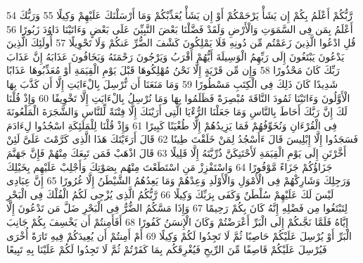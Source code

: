 \documentclass[20pt,a4paper]{article}
\begin{document}
{\tiny\colorbox{cl_aya}{54}} رَّبُّكُمْ أَعْلَمُ بِكُمْ إِن يَشَأْ يَرْحَمْكُمْ أَوْ إِن يَشَأْ يُعَذِّبْكُمْ وَمَا أَرْسَلْنَكَ عَلَيْهِمْ وَكِيلًا
{\tiny\colorbox{cl_aya}{55}} وَرَبُّكَ أَعْلَمُ بِمَن فِى السَّمَوَتِ وَالْأَرْضِ وَلَقَدْ فَضَّلْنَا بَعْضَ النَّبِيِّنَ عَلَى بَعْضٍ وَءَاتَيْنَا دَاوُدَ زَبُورًا
{\tiny\colorbox{cl_aya}{56}} قُلِ ادْعُوا الَّذِينَ زَعَمْتُم مِّن دُونِهِ فَلَا يَمْلِكُونَ كَشْفَ الضُّرِّ عَنكُمْ وَلَا تَحْوِيلًا
{\tiny\colorbox{cl_aya}{57}} أُولَئِكَ الَّذِينَ يَدْعُونَ يَبْتَغُونَ إِلَى رَبِّهِمُ الْوَسِيلَةَ أَيُّهُمْ أَقْرَبُ وَيَرْجُونَ رَحْمَتَهُ وَيَخَافُونَ عَذَابَهُ إِنَّ عَذَابَ رَبِّكَ كَانَ مَحْذُورًا
{\tiny\colorbox{cl_aya}{58}} وَإِن مِّن قَرْيَةٍ إِلَّا نَحْنُ مُهْلِكُوهَا قَبْلَ يَوْمِ الْقِيَمَةِ أَوْ مُعَذِّبُوهَا عَذَابًا شَدِيدًا كَانَ ذَلِكَ فِى الْكِتَبِ مَسْطُورًا
{\tiny\colorbox{cl_aya}{59}} وَمَا مَنَعَنَا أَن نُّرْسِلَ بِالْءَايَتِ إِلَّا أَن كَذَّبَ بِهَا الْأَوَّلُونَ وَءَاتَيْنَا ثَمُودَ النَّاقَةَ مُبْصِرَةً فَظَلَمُوا بِهَا وَمَا نُرْسِلُ بِالْءَايَتِ إِلَّا تَخْوِيفًا
{\tiny\colorbox{cl_aya}{60}} وَإِذْ قُلْنَا لَكَ إِنَّ رَبَّكَ أَحَاطَ بِالنَّاسِ وَمَا جَعَلْنَا الرُّءْيَا الَّتِى أَرَيْنَكَ إِلَّا فِتْنَةً لِّلنَّاسِ وَالشَّجَرَةَ الْمَلْعُونَةَ فِى الْقُرْءَانِ وَنُخَوِّفُهُمْ فَمَا يَزِيدُهُمْ إِلَّا طُغْيَنًا كَبِيرًا
{\tiny\colorbox{cl_aya}{61}} وَإِذْ قُلْنَا لِلْمَلَئِكَةِ اسْجُدُوا لِءَادَمَ فَسَجَدُوا إِلَّا إِبْلِيسَ قَالَ ءَأَسْجُدُ لِمَنْ خَلَقْتَ طِينًا
{\tiny\colorbox{cl_aya}{62}} قَالَ أَرَءَيْتَكَ هَذَا الَّذِى كَرَّمْتَ عَلَىَّ لَئِنْ أَخَّرْتَنِ إِلَى يَوْمِ الْقِيَمَةِ لَأَحْتَنِكَنَّ ذُرِّيَّتَهُ إِلَّا قَلِيلًا
{\tiny\colorbox{cl_aya}{63}} قَالَ اذْهَبْ فَمَن تَبِعَكَ مِنْهُمْ فَإِنَّ جَهَنَّمَ جَزَاؤُكُمْ جَزَاءً مَّوْفُورًا
{\tiny\colorbox{cl_aya}{64}} وَاسْتَفْزِزْ مَنِ اسْتَطَعْتَ مِنْهُم بِصَوْتِكَ وَأَجْلِبْ عَلَيْهِم بِخَيْلِكَ وَرَجِلِكَ وَشَارِكْهُمْ فِى الْأَمْوَلِ وَالْأَوْلَدِ وَعِدْهُمْ وَمَا يَعِدُهُمُ الشَّيْطَنُ إِلَّا غُرُورًا
{\tiny\colorbox{cl_aya}{65}} إِنَّ عِبَادِى لَيْسَ لَكَ عَلَيْهِمْ سُلْطَنٌ وَكَفَى بِرَبِّكَ وَكِيلًا
{\tiny\colorbox{cl_aya}{66}} رَّبُّكُمُ الَّذِى يُزْجِى لَكُمُ الْفُلْكَ فِى الْبَحْرِ لِتَبْتَغُوا مِن فَضْلِهِ إِنَّهُ كَانَ بِكُمْ رَحِيمًا
{\tiny\colorbox{cl_aya}{67}} وَإِذَا مَسَّكُمُ الضُّرُّ فِى الْبَحْرِ ضَلَّ مَن تَدْعُونَ إِلَّا إِيَّاهُ فَلَمَّا نَجَّىكُمْ إِلَى الْبَرِّ أَعْرَضْتُمْ وَكَانَ الْإِنسَنُ كَفُورًا
{\tiny\colorbox{cl_aya}{68}} أَفَأَمِنتُمْ أَن يَخْسِفَ بِكُمْ جَانِبَ الْبَرِّ أَوْ يُرْسِلَ عَلَيْكُمْ حَاصِبًا ثُمَّ لَا تَجِدُوا لَكُمْ وَكِيلًا
{\tiny\colorbox{cl_aya}{69}} أَمْ أَمِنتُمْ أَن يُعِيدَكُمْ فِيهِ تَارَةً أُخْرَى فَيُرْسِلَ عَلَيْكُمْ قَاصِفًا مِّنَ الرِّيحِ فَيُغْرِقَكُم بِمَا كَفَرْتُمْ ثُمَّ لَا تَجِدُوا لَكُمْ عَلَيْنَا بِهِ تَبِيعًا
\end{document}
